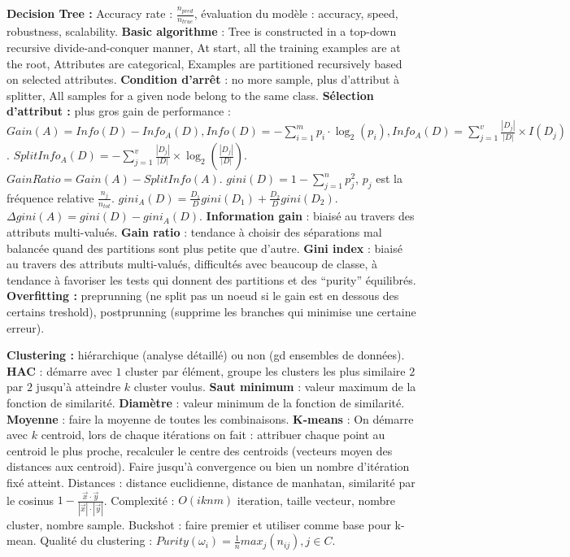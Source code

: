 \documentclass[9pt,a4paper]{report}
\begin{document}
\textbf{Decision Tree :} Accuracy rate : $\frac{n_{pred}}{n_{true}}$, évaluation du modèle : accuracy, speed, robustness, scalability. \textbf{Basic algorithme} : Tree is constructed in a top-down recursive divide-and-conquer manner, At start, all the training examples are at the root, Attributes are categorical, Examples are partitioned recursively based on selected attributes. \textbf{Condition d'arrêt} : no more sample, plus d'attribut à splitter, All samples for a given node belong to the same class. \textbf{Sélection d'attribut :} plus gros gain de performance : $Gain(A)=Info(D)-Info_A(D), Info(D)=-\sum_{i=1}^mp_i\cdot\log_2(p_i), Info_A(D)=\sum_{j=1}^v\frac{|D_j|}{|D|}\times I(D_j)$. $SplitInfo_A(D)=-\sum_{j=1}^v\frac{|D_j|}{|D|}\times\log_2(\frac{|D_j|}{|D|})$. $GainRatio = Gain(A)-SplitInfo(A)$. $gini(D)=1-\sum_{j=1}^np^2_j$, $p_j$ est la fréquence relative $\frac{n_j}{n_{tot}}$. $gini_A(D)=\frac{D_1}{D}gini(D_1)+\frac{D_2}{D}gini(D_2)$. $\Delta gini(A)=gini(D)-gini_A(D)$.
\textbf{Information gain} : biaisé au travers des attributs multi-valués.
\textbf{Gain ratio} : tendance à choisir des séparations mal balancée quand des partitions sont plus petite que d’autre.
\textbf{Gini index} : biaisé au travers des attributs multi-valués, difficultés avec beaucoup de classe, à tendance à favoriser les tests qui donnent des partitions et des “purity” équilibrés.
\textbf{Overfitting :} preprunning (ne split pas un noeud si le gain est en dessous des certains treshold), postprunning (supprime les branches qui minimise une certaine erreur).

\textbf{Clustering :} hiérarchique (analyse détaillé) ou non (gd ensembles de données). \textbf{HAC} : démarre avec $1$ cluster par élément, groupe les clusters les plus similaire $2$ par $2$ jusqu'à atteindre $k$ cluster voulus. \textbf{Saut minimum} : valeur maximum de la fonction de similarité. \textbf{Diamètre} : valeur minimum de la fonction de similarité. \textbf{Moyenne} : faire la moyenne de toutes les combinaisons. \textbf{K-means} : On démarre avec $k$ centroid, lors de chaque itérations on fait : attribuer chaque point au centroid le plus proche, recalculer le centre des centroids (vecteurs moyen des distances aux centroid). Faire jusqu'à convergence ou bien un nombre d'itération fixé atteint. Distances : distance euclidienne, distance de manhatan, similarité par le cosinus $1-\frac{\vec{x}\cdot\vec{y}}{|\vec{x}|\cdot|\vec{y}|}$. Complexité : $O(iknm)$ iteration, taille vecteur, nombre cluster, nombre sample. Buckshot : faire premier et utiliser comme base pour k-mean. Qualité du clustering : $Purity(\omega_i)=\frac{1}{n}max_j(n_{ij}), j\in C$.
\end{document}
